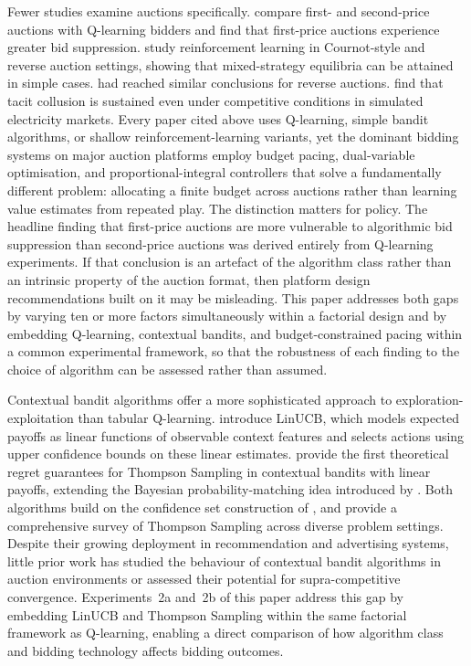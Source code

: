Fewer studies examine auctions specifically. \citet{BanchioSkrzypacz2022} compare first- and second-price auctions with Q-learning bidders and find that first-price auctions experience greater bid suppression. \citet{WaltmanKaymak2008} study reinforcement learning in Cournot-style and reverse auction settings, showing that mixed-strategy equilibria can be attained in simple cases. \citet{Bandyopadhyay2008} had reached similar conclusions for reverse auctions. \citet{Tellidou2007} find that tacit collusion is sustained even under competitive conditions in simulated electricity markets. Every paper cited above uses Q-learning, simple bandit algorithms, or shallow reinforcement-learning variants, yet the dominant bidding systems on major auction platforms employ budget pacing, dual-variable optimisation, and proportional-integral controllers that solve a fundamentally different problem: allocating a finite budget across auctions rather than learning value estimates from repeated play. The distinction matters for policy. The headline finding that first-price auctions are more vulnerable to algorithmic bid suppression than second-price auctions \citep{BanchioSkrzypacz2022} was derived entirely from Q-learning experiments. If that conclusion is an artefact of the algorithm class rather than an intrinsic property of the auction format, then platform design recommendations built on it may be misleading. This paper addresses both gaps by varying ten or more factors simultaneously within a factorial design and by embedding Q-learning, contextual bandits, and budget-constrained pacing within a common experimental framework, so that the robustness of each finding to the choice of algorithm can be assessed rather than assumed.

Contextual bandit algorithms offer a more sophisticated approach to exploration-exploitation than tabular Q-learning. \citet{Li2010LinUCB} introduce LinUCB, which models expected payoffs as linear functions of observable context features and selects actions using upper confidence bounds on these linear estimates. \citet{AgrawalGoyal2013} provide the first theoretical regret guarantees for Thompson Sampling in contextual bandits with linear payoffs, extending the Bayesian probability-matching idea introduced by \citet{Thompson1933}. Both algorithms build on the confidence set construction of \citet{AbbasiYadkori2011}, and \citet{Russo2018Thompson} provide a comprehensive survey of Thompson Sampling across diverse problem settings. Despite their growing deployment in recommendation and advertising systems, little prior work has studied the behaviour of contextual bandit algorithms in auction environments or assessed their potential for supra-competitive convergence. Experiments~2a and~2b of this paper address this gap by embedding LinUCB and Thompson Sampling within the same factorial framework as Q-learning, enabling a direct comparison of how algorithm class and bidding technology affects bidding outcomes.

